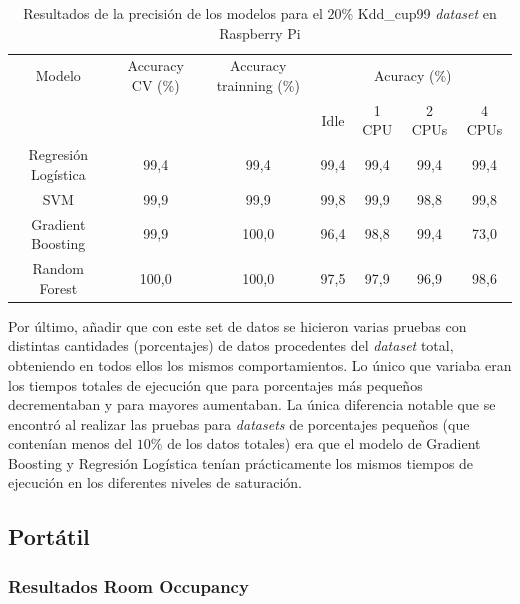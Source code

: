 \documentclass[a4paper, 12pt]{book}
\begin{document}
\begin{table}[htb]
\renewcommand{\arraystretch}{1.5}
\begin{adjustbox}{width=\textwidth}
\centering
    \begin{tabular}{c  c  c  c  c  c  c}
    \hline
    Modelo & Accuracy CV (\%) & Accuracy trainning (\%) & \multicolumn{4}{c}{Acuracy (\%)} \\
    \cline{4-7}
     &  &   &  Idle & 1 CPU & 2 CPUs & 4 CPUs \\
     \hline
     Regresión Logística & 99,4 & 99,4 & 99,4 & 99,4 & 99,4 & 99,4\\
     SVM & 99,9 & 99,9 & 99,8 & 99,9 & 98,8 & 99,8\\
     Gradient Boosting & 99,9 & 100,0 & 96,4 & 98,8 & 99,4 & 73,0\\
     Random Forest & 100,0 & 100,0 & 97,5 & 97,9 & 96,9 & 98,6\\
    \hline
    \end{tabular}
\end{adjustbox}
\caption{Resultados de la precisión de los modelos para el $20\%$ Kdd\_cup99 \textit{dataset} en Raspberry Pi}
\label{tab:acc_Kddraspberry}
\end{table}

Por último, añadir que con este set de datos se hicieron varias pruebas con distintas cantidades (porcentajes) de datos procedentes del \textit{dataset} total, obteniendo en todos ellos los mismos comportamientos. Lo único que variaba eran los tiempos totales de ejecución que para porcentajes más pequeños decrementaban y para mayores aumentaban. La única diferencia notable que se encontró al realizar las pruebas para \textit{datasets} de porcentajes pequeños (que contenían menos del $10\%$ de los datos totales) era que el modelo de Gradient Boosting y Regresión Logística tenían prácticamente los mismos tiempos de ejecución en los diferentes niveles de saturación.

\subsection{Portátil}
\label{subsec:pc_sinteticos}

\subsubsection{Resultados Room Occupancy}
\label{subsubsec:occ_pc}
\end{document}
